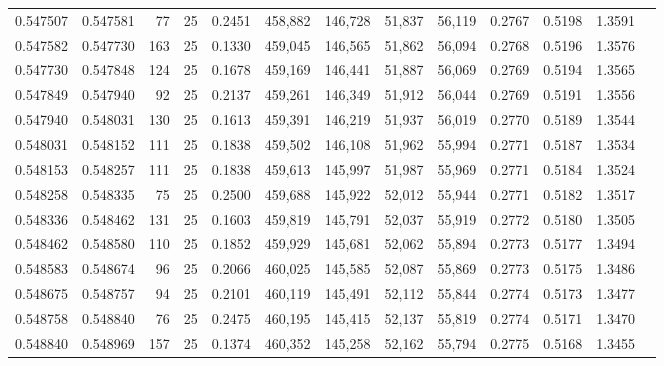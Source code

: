 \begin{tabular}{rrrrrrrrrrrrr}
0.547507 & 0.547581 &    77 &  25 &                                     0.2451 & 458,882 & 146,728 &  51,837 &  56,119 & 0.2767 & 0.5198 & 1.3591 \\
0.547582 & 0.547730 &   163 &  25 &                                     0.1330 & 459,045 & 146,565 &  51,862 &  56,094 & 0.2768 & 0.5196 & 1.3576 \\
0.547730 & 0.547848 &   124 &  25 &                                     0.1678 & 459,169 & 146,441 &  51,887 &  56,069 & 0.2769 & 0.5194 & 1.3565 \\
0.547849 & 0.547940 &    92 &  25 &                                     0.2137 & 459,261 & 146,349 &  51,912 &  56,044 & 0.2769 & 0.5191 & 1.3556 \\
0.547940 & 0.548031 &   130 &  25 &                                     0.1613 & 459,391 & 146,219 &  51,937 &  56,019 & 0.2770 & 0.5189 & 1.3544 \\
0.548031 & 0.548152 &   111 &  25 &                                     0.1838 & 459,502 & 146,108 &  51,962 &  55,994 & 0.2771 & 0.5187 & 1.3534 \\
0.548153 & 0.548257 &   111 &  25 &                                     0.1838 & 459,613 & 145,997 &  51,987 &  55,969 & 0.2771 & 0.5184 & 1.3524 \\
0.548258 & 0.548335 &    75 &  25 &                                     0.2500 & 459,688 & 145,922 &  52,012 &  55,944 & 0.2771 & 0.5182 & 1.3517 \\
0.548336 & 0.548462 &   131 &  25 &                                     0.1603 & 459,819 & 145,791 &  52,037 &  55,919 & 0.2772 & 0.5180 & 1.3505 \\
0.548462 & 0.548580 &   110 &  25 &                                     0.1852 & 459,929 & 145,681 &  52,062 &  55,894 & 0.2773 & 0.5177 & 1.3494 \\
0.548583 & 0.548674 &    96 &  25 &                                     0.2066 & 460,025 & 145,585 &  52,087 &  55,869 & 0.2773 & 0.5175 & 1.3486 \\
0.548675 & 0.548757 &    94 &  25 &                                     0.2101 & 460,119 & 145,491 &  52,112 &  55,844 & 0.2774 & 0.5173 & 1.3477 \\
0.548758 & 0.548840 &    76 &  25 &                                     0.2475 & 460,195 & 145,415 &  52,137 &  55,819 & 0.2774 & 0.5171 & 1.3470 \\
0.548840 & 0.548969 &   157 &  25 &                                     0.1374 & 460,352 & 145,258 &  52,162 &  55,794 & 0.2775 & 0.5168 & 1.3455 \\

\end{tabular}
